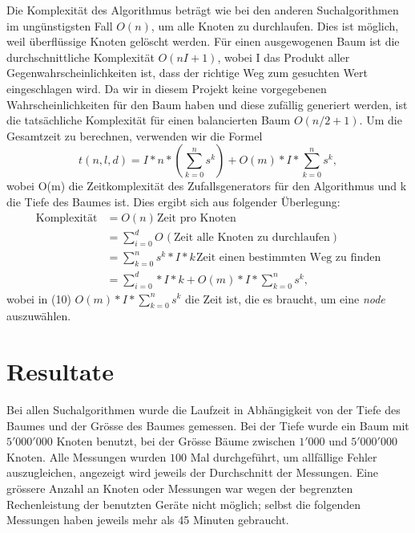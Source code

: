 \documentclass[a4paper,11pt]{article}
\begin{document}
Die Komplexität des Algorithmus beträgt wie bei den anderen Suchalgorithmen im ungünstigsten Fall $O(n)$, um alle Knoten zu durchlaufen. Dies ist möglich, weil überflüssige Knoten gelöscht werden. Für einen ausgewogenen Baum ist die durchschnittliche Komplexität $O(nI+1)$, wobei I das Produkt aller Gegenwahrscheinlichkeiten ist, dass der richtige Weg zum gesuchten Wert eingeschlagen wird. Da wir in diesem Projekt keine vorgegebenen Wahrscheinlichkeiten für den Baum haben und diese zufällig generiert werden, ist die tatsächliche Komplexität für einen balancierten Baum $O(n/2+1)$. 
Um die Gesamtzeit zu berechnen, verwenden wir die Formel $$ t(n,l,d) = I*n*(\sum_{k=0}^{n} s^k) + O(m)*I*\sum_{k=0}^{n} s^k,$$ wobei O(m) die Zeitkomplexität des Zufallsgenerators für den Algorithmus und k die Tiefe des Baumes ist. Dies ergibt sich aus folgender Überlegung:
\begin{align}
  \text{Komplexität} &= O(n) \hspace{1pt} \text{Zeit pro Knoten }  \\
  &= \sum_{i=0}^{d} O \hspace{1pt} (\text{Zeit alle Knoten zu durchlaufen}) \\
  &= \sum_{k=0}^{n} s^k*I*k \hspace{1pt} \text{Zeit einen bestimmten Weg zu finden} \\
  &= \sum_{i=0}^{d}*I*k+O(m)*I*\sum_{k=0}^{n} s^k,
\end{align}
wobei in (10) $O(m)*I*\sum_{k=0}^{n} s^k$ die Zeit ist, die es braucht, um eine \emph{node} auszuwählen.

\section{Resultate}
Bei allen Suchalgorithmen wurde die Laufzeit in Abhängigkeit von der Tiefe des Baumes und der Grösse des Baumes gemessen. Bei der Tiefe wurde ein Baum mit $5'000'000$ Knoten benutzt, bei der Grösse Bäume zwischen $1'000$ und $5'000'000$ Knoten. Alle Messungen wurden $100$ Mal durchgeführt, um allfällige Fehler auszugleichen, angezeigt wird jeweils der Durchschnitt der Messungen. Eine grössere Anzahl an Knoten oder Messungen war wegen der begrenzten Rechenleistung der benutzten Geräte nicht möglich; selbst die folgenden Messungen haben jeweils mehr als 45 Minuten gebraucht.
\end{document}
